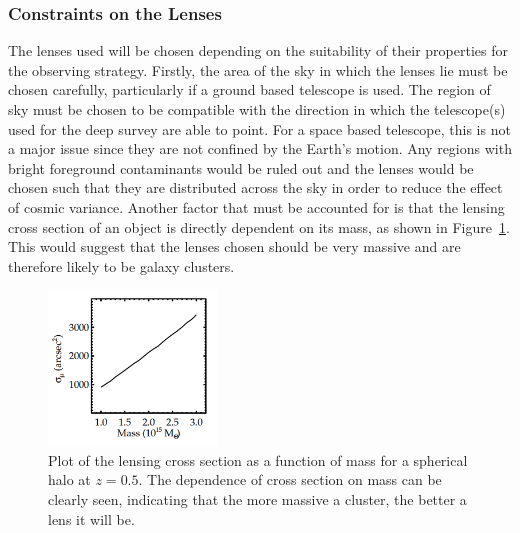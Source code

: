 	\subsubsection{Constraints on the Lenses} %
	\label{sub:constraints_on_the_lenses}
		The lenses used will be chosen depending on the suitability of their properties for the observing strategy. Firstly, the area of the sky in which the lenses lie must be chosen carefully, particularly if a ground based telescope is used. The region of sky must be chosen to be compatible with the direction in which the telescope(s) used for the deep survey are able to point. For a space based telescope, this is not a major issue since they are not confined by the Earth’s motion. Any regions with bright foreground contaminants would be ruled out and the lenses would be chosen such that they are distributed across the sky in order to reduce the effect of cosmic variance. Another factor that must be accounted for is that the lensing cross section of an object is directly dependent on its mass, as shown in Figure~\ref{fig:Lensing_cross_section_as_a_function_of_mass}\cite{Optimal_mass_configurations}. This would suggest that the lenses chosen should be very massive and are therefore likely to be galaxy clusters.
		\begin{figure}[!htbp]
			\centering
				\includegraphics[width=0.4\textwidth]{../Images/Lensing_cross_section_as_a_function_of_mass.png}
			\caption[Lensing cross section as a function of mass]{\cite{Optimal_mass_configurations}Plot of the lensing cross section as a function of mass for a spherical halo at $z=0.5$. The dependence of cross section on mass can be clearly seen, indicating that the more massive a cluster, the better a lens it will be.\label{fig:Lensing_cross_section_as_a_function_of_mass}}
		\end{figure}

